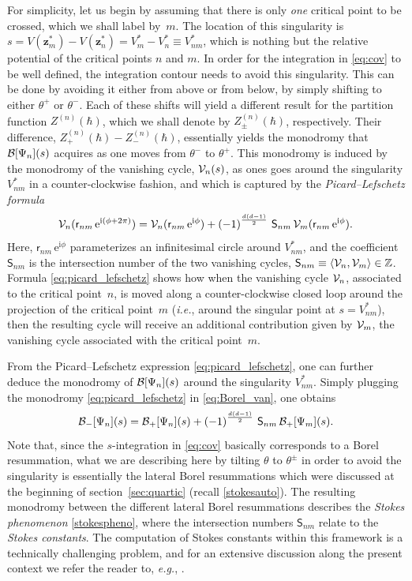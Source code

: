\documentclass[11pt,a4paper]{article}
\newcommand{\CB}{{\cal B}}
\newcommand{\CV}{{\cal V}}
\def\BZ{{\mathbb Z}}
\newcommand{\be}{\begin{equation}}
\newcommand{\ee}{\end{equation}}
\newcommand{\rme}{{\mathrm{e}}}
\newcommand{\rmi}{{\mathrm{i}}}
\begin{document}
For simplicity, let us begin by assuming that there is only \textit{one} critical point to be crossed, which we shall label by~$m$. The location of this singularity is $s = V (\boldsymbol{z}^*_m) - V (\boldsymbol{z}^*_n) = V^*_m - V^*_n \equiv V^*_{nm}$, which is nothing but the relative potential of the critical points $n$ and $m$. In order for the integration in \eqref{eq:cov} to be well defined, the integration contour needs to avoid this singularity. This can be done by avoiding it either from above or from below, by simply shifting to either $\theta^+$ or $\theta^-$. Each of these shifts will yield a different result for the partition function $Z^{(n)} (\hbar)$, which we shall denote by $Z_{\pm}^{(n)} (\hbar)$, respectively. Their difference, $Z_{+}^{(n)} (\hbar) - Z_{-}^{(n)} (\hbar)$, essentially yields the monodromy that $\CB[\Psi_n](s)$ acquires as one moves from $\theta^-$ to $\theta^+$. This monodromy is induced by the monodromy of the vanishing cycle, $\CV_n (s)$, as ones goes around the singularity $V^*_{nm}$ in a counter-clockwise fashion, and which is captured by the \textit{Picard--Lefschetz formula} \cite{l24}
%
\be
\label{eq:picard_lefschetz}
\CV_n ( \mathsf{r}_{nm}\, \rme^{\rmi \left( \phi + 2\pi \right)} ) = \CV_n ( \mathsf{r}_{nm}\, \rme^{\rmi\phi} ) + \left(-1\right)^{\frac{d \left(d-1\right)}{2}}\, \mathsf{S}_{nm}\, \CV_m ( \mathsf{r}_{nm}\, \rme^{\rmi\phi} ).
\ee
%
\noindent
Here, $\mathsf{r}_{nm}\, \rme^{\rmi\phi}$ parameterizes an infinitesimal circle around $V^*_{nm}$, and the coefficient $\mathsf{S}_{nm}$ is the intersection number of the two vanishing cycles, $\mathsf{S}_{nm} \equiv \langle \CV_n, \CV_m \rangle \in \BZ$. Formula \eqref{eq:picard_lefschetz} shows how when the vanishing cycle $\CV_n$, associated to the critical point~$n$, is moved along a counter-clockwise closed loop around the projection of the critical point~$m$ (\textit{i.e.}, around the singular point at $s = V^*_{nm}$), then the resulting cycle will receive an additional contribution given by $\CV_m$, the vanishing cycle associated with the critical point~$m$.   

From the Picard--Lefschetz expression \eqref{eq:picard_lefschetz}, one can further deduce the monodromy of $\CB[\Psi_n](s)$ around the singularity $V^*_{nm}$. Simply plugging the monodromy \eqref{eq:picard_lefschetz} in \eqref{eq:Borel_van}, one obtains
%
\be
\label{eq:borel_pl}
\CB_-[\Psi_n](s) = \CB_+[\Psi_n](s) + \left(-1\right)^{\frac{d \left(d-1\right)}{2}}\, \mathsf{S}_{nm}\, \CB_+[\Psi_m](s).
\ee
%
\noindent
Note that, since the $s$-integration in \eqref{eq:cov} basically corresponds to a Borel resummation, what we are describing here by tilting $\theta$ to $\theta^{\pm}$ in order to avoid the singularity is essentially the lateral Borel resummations which were discussed at the beginning of section~\ref{sec:quartic} (recall \eqref{stokesauto}). The resulting monodromy between the different lateral Borel resummations describes the \textit{Stokes phenomenon} \eqref{stokespheno}, where the intersection numbers $\mathsf{S}_{nm}$ relate to the \textit{Stokes constants}. The computation of Stokes constants within this framework is a technically challenging problem, and for an extensive discussion along the present context we refer the reader to, \textit{e.g.}, \cite{h97, bh90, bh91}.
\end{document}

